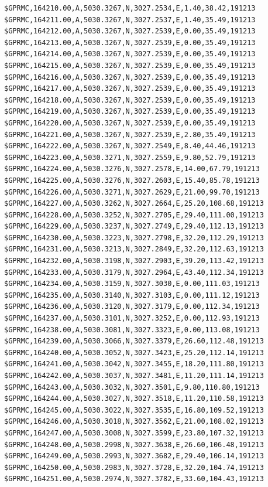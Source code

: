 \documentclass[simple,a4paper,14pt,ukrainian,utf8]{eskdtext}
\begin{document}
\begin{appendices}
\begin{small}
\begin{lstlisting}
$GPRMC,164210.00,A,5030.3267,N,3027.2534,E,1.40,38.42,191213
$GPRMC,164211.00,A,5030.3267,N,3027.2537,E,1.40,35.49,191213
$GPRMC,164212.00,A,5030.3267,N,3027.2539,E,0.00,35.49,191213
$GPRMC,164213.00,A,5030.3267,N,3027.2539,E,0.00,35.49,191213
$GPRMC,164214.00,A,5030.3267,N,3027.2539,E,0.00,35.49,191213
$GPRMC,164215.00,A,5030.3267,N,3027.2539,E,0.00,35.49,191213
$GPRMC,164216.00,A,5030.3267,N,3027.2539,E,0.00,35.49,191213
$GPRMC,164217.00,A,5030.3267,N,3027.2539,E,0.00,35.49,191213
$GPRMC,164218.00,A,5030.3267,N,3027.2539,E,0.00,35.49,191213
$GPRMC,164219.00,A,5030.3267,N,3027.2539,E,0.00,35.49,191213
$GPRMC,164220.00,A,5030.3267,N,3027.2539,E,0.00,35.49,191213
$GPRMC,164221.00,A,5030.3267,N,3027.2539,E,2.80,35.49,191213
$GPRMC,164222.00,A,5030.3267,N,3027.2549,E,8.40,44.46,191213
$GPRMC,164223.00,A,5030.3271,N,3027.2559,E,9.80,52.79,191213
$GPRMC,164224.00,A,5030.3276,N,3027.2578,E,14.00,67.79,191213
$GPRMC,164225.00,A,5030.3276,N,3027.2603,E,15.40,85.78,191213
$GPRMC,164226.00,A,5030.3271,N,3027.2629,E,21.00,99.70,191213
$GPRMC,164227.00,A,5030.3262,N,3027.2664,E,25.20,108.68,191213
$GPRMC,164228.00,A,5030.3252,N,3027.2705,E,29.40,111.00,191213
$GPRMC,164229.00,A,5030.3237,N,3027.2749,E,29.40,112.13,191213
$GPRMC,164230.00,A,5030.3223,N,3027.2798,E,32.20,112.29,191213
$GPRMC,164231.00,A,5030.3213,N,3027.2849,E,32.20,112.63,191213
$GPRMC,164232.00,A,5030.3198,N,3027.2903,E,39.20,113.42,191213
$GPRMC,164233.00,A,5030.3179,N,3027.2964,E,43.40,112.34,191213
$GPRMC,164234.00,A,5030.3159,N,3027.3030,E,0.00,111.03,191213
$GPRMC,164235.00,A,5030.3140,N,3027.3103,E,0.00,111.12,191213
$GPRMC,164236.00,A,5030.3120,N,3027.3179,E,0.00,112.34,191213
$GPRMC,164237.00,A,5030.3101,N,3027.3252,E,0.00,112.93,191213
$GPRMC,164238.00,A,5030.3081,N,3027.3323,E,0.00,113.08,191213
$GPRMC,164239.00,A,5030.3066,N,3027.3379,E,26.60,112.48,191213
$GPRMC,164240.00,A,5030.3052,N,3027.3423,E,25.20,112.14,191213
$GPRMC,164241.00,A,5030.3042,N,3027.3455,E,18.20,111.80,191213
$GPRMC,164242.00,A,5030.3037,N,3027.3481,E,11.20,111.14,191213
$GPRMC,164243.00,A,5030.3032,N,3027.3501,E,9.80,110.80,191213
$GPRMC,164244.00,A,5030.3027,N,3027.3518,E,11.20,110.58,191213
$GPRMC,164245.00,A,5030.3022,N,3027.3535,E,16.80,109.52,191213
$GPRMC,164246.00,A,5030.3018,N,3027.3562,E,21.00,108.02,191213
$GPRMC,164247.00,A,5030.3008,N,3027.3599,E,23.80,107.32,191213
$GPRMC,164248.00,A,5030.2998,N,3027.3638,E,26.60,106.48,191213
$GPRMC,164249.00,A,5030.2993,N,3027.3682,E,29.40,106.14,191213
$GPRMC,164250.00,A,5030.2983,N,3027.3728,E,32.20,104.74,191213
$GPRMC,164251.00,A,5030.2974,N,3027.3782,E,33.60,104.43,191213

\end{lstlisting}
\end{small}
\end{appendices}
\end{document}
